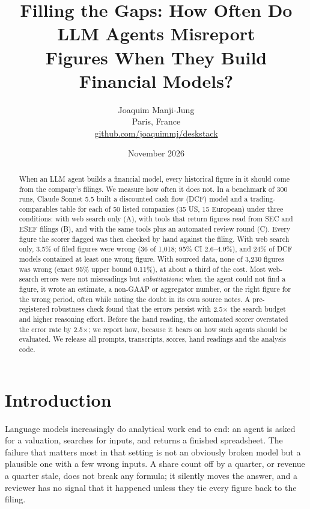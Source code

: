 \documentclass[10pt,a4paper]{article}
\title{\textbf{Filling the Gaps: How Often Do LLM Agents Misreport\\ Figures When They Build Financial Models?}}
\author{Joaquim Manji-Jung\\[2pt]
\small Paris, France\\
\small \href{https://github.com/joaquimmj/deskstack}{github.com/joaquimmj/deskstack}}
\date{November 2026}
\begin{document}
\maketitle

\begin{abstract}
\noindent When an LLM agent builds a financial model, every historical figure in it should come from the company's
filings. We measure how often it does not. In a benchmark of 300 runs, Claude Sonnet 5.5 built a discounted cash
flow (DCF) model and a trading-comparables table for each of 50 listed companies (35 US, 15 European) under three
conditions: with web search only (A), with tools that return figures read from SEC and ESEF filings (B), and with
the same tools plus an automated review round (C). Every figure the scorer flagged was then checked by hand against
the filing. With web search only, 3.5\% of filed figures were wrong (36 of 1{,}018; 95\% CI 2.6--4.9\%), and 24\%
of DCF models contained at least one wrong figure. With sourced data, none of 3{,}230 figures was wrong (exact
95\% upper bound 0.11\%), at about a third of the cost. Most web-search errors were not misreadings but
\emph{substitutions}: when the agent could not find a figure, it wrote an estimate, a non-GAAP or aggregator number,
or the right figure for the wrong period, often while noting the doubt in its own source notes. A pre-registered
robustness check found that the errors persist with 2.5$\times$ the search budget and higher reasoning effort.
Before the hand reading, the automated scorer overstated the error rate by 2.5$\times$; we report how, because it
bears on how such agents should be evaluated. We release all prompts, transcripts, scores, hand readings and the
analysis code.
\end{abstract}

\section{Introduction}

Language models increasingly do analytical work end to end: an agent is asked for a valuation, searches for inputs,
and returns a finished spreadsheet. The failure that matters most in that setting is not an obviously broken model
but a plausible one with a few wrong inputs. A share count off by a quarter, or revenue a quarter stale, does not
break any formula; it silently moves the answer, and a reviewer has no signal that it happened unless they tie every
figure back to the filing.
\end{document}
